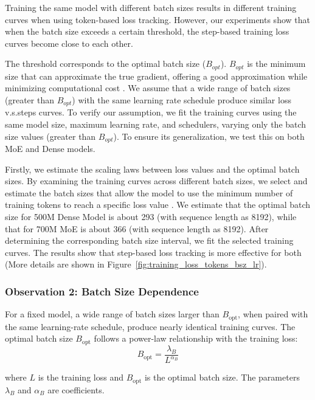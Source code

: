 \documentclass[letterpaper]{article} %
\begin{document}
Training the same model with different batch sizes results in different training curves when using token-based loss tracking. However, our experiments show that when the batch size exceeds a certain threshold, the step-based training loss curves become close to each other.

The threshold corresponds to the optimal batch size (\(B_{opt}\)). \(B_{opt}\) is the minimum size that can approximate the true gradient, offering a good approximation while minimizing computational cost \cite{mccandlish2018empirical, Li2024SurgePI}. We assume that a wide range of batch sizes (greater than \(B_{opt}\)) with the same learning rate schedule produce similar loss v.s.steps curves. To verify our assumption, we fit the training curves using the same model size, maximum learning rate, and schedulers, varying only the batch size values (greater than \(B_{opt}\)). To ensure its generalization, we test this on both MoE and Dense models. 


Firstly, we estimate the scaling laws between loss values and the optimal batch sizes. By examining the training curves across different batch sizes, we select and estimate the batch sizes that allow the model to use the minimum number of training tokens to reach a specific loss value \cite{Hu2024MiniCPMUT}.  We estimate that the optimal batch size for 500M Dense Model is about 293 (with sequence length as 8192), while that for 700M MoE is about 366 (with sequence length as 8192). After determining the corresponding batch size interval, we fit the selected training curves. The results show that step-based loss tracking is more effective for both (More details are shown in Figure~\ref{fig:training_loss_tokens_bsz_lr}).

\subsubsection*{Observation 2: Batch Size Dependence}

For a fixed model, a wide range of batch sizes larger than \(B_{\text{opt}}\), when paired with the same learning-rate schedule, produce nearly identical training curves. 
The optimal batch size \(B_{\text{opt}}\) follows a power-law relationship with the training loss:
\begin{equation}
	B_{\text{opt}} = \frac{\lambda_B}{L^{\alpha_B}}
	\label{eq:B_opt_Loss_function}
\end{equation}

\noindent where \(L\) is the training loss and \(B_{\text{opt}}\) is the optimal batch size. 
The parameters \(\lambda_B\) and \(\alpha_B\) are coefficients.
\end{document}
